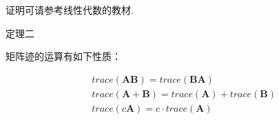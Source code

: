 \documentclass[UTF8]{ctexart}
\begin{document}
    证明可请参考线性代数的教材.
    
    定理二
    
    矩阵迹的运算有如下性质：
    
    \begin{equation}\
    	\begin{aligned}
    	    & trace(\boldsymbol{A} \boldsymbol{B}) = trace(\boldsymbol{B} \boldsymbol{A}) \\
    	    & trace(\boldsymbol{A} + \boldsymbol{B}) = trace(\boldsymbol{A}) + trace(\boldsymbol{B}) \\
    	    & trace(c \boldsymbol{A}) = c \cdot trace(\boldsymbol{A})
    	\end{aligned}
    \end{equation}
    
	
	
	
%	
	
\end{document}
